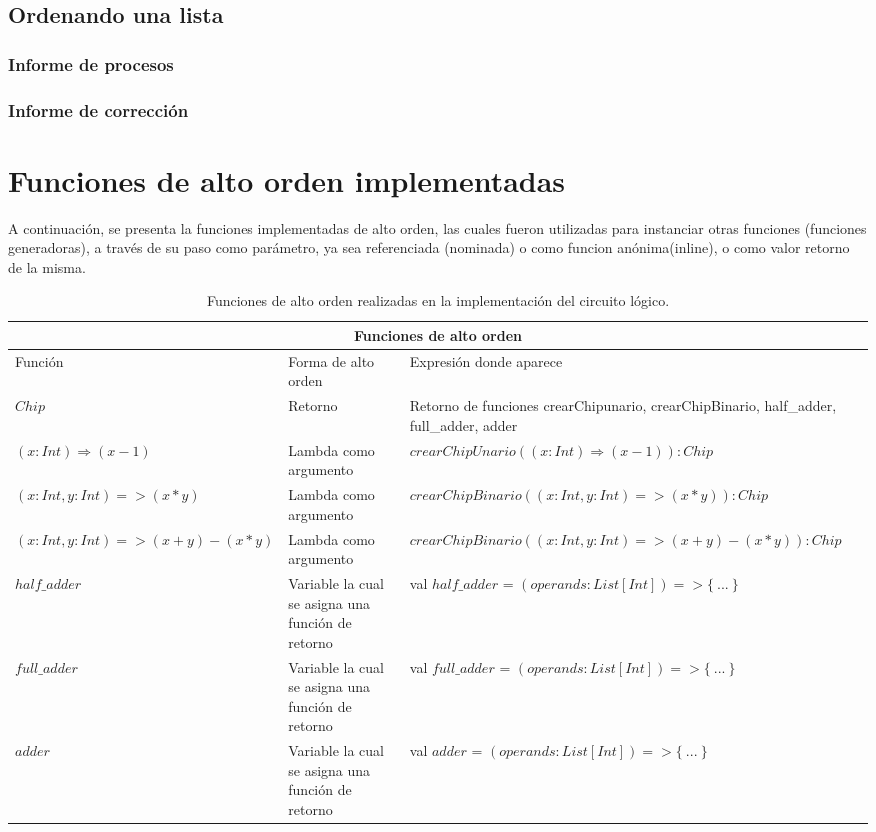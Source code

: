 \documentclass[12pt, a4paper]{article}
\begin{document}
\subsection{Ordenando una lista}
\subsubsection{Informe de procesos}
\subsubsection{Informe de corrección}
\section{Funciones de alto orden implementadas}

A continuación, se presenta la funciones implementadas de alto orden, las cuales fueron utilizadas para instanciar otras funciones (funciones generadoras), a través de su paso como parámetro, ya sea referenciada (nominada) o como funcion anónima(inline), o como valor retorno de la misma. \\[16pt]

\begin{table}
 \scriptsize
\begin{tabular}{ |p{4cm}||p{3cm}|p{5.5cm}|  }
 \hline
 \multicolumn{3}{|c|}{Funciones de alto orden} \\
 \hline
 Función& Forma de alto orden  & Expresión donde aparece\\
 \hline
  $Chip$ & Retorno & Retorno de funciones crearChipunario, crearChipBinario, half\_adder, full\_adder, adder\\
  \hline
  $(x:Int) \Rightarrow (x - 1)$  & Lambda como argumento &  $crearChipUnario((x:Int) \Rightarrow (x - 1)):Chip$\\
  \hline
  $ (x: Int, y: Int ) => (x * y)$  & Lambda como argumento &  $crearChipBinario((x: Int, y: Int ) => (x * y)): Chip$\\
  \hline
  $(x: Int, y: Int ) => (x + y) - (x * y )$  & Lambda como argumento &  $crearChipBinario((x: Int, y: Int ) => (x + y) - (x * y )): Chip$\\
\hline
  $half\_adder$ & Variable la cual se asigna una función de retorno & val $half\_adder$ = $( operands: List[Int]) => \{~...~ \}$\\
\hline
  $full\_adder$& Variable la cual se asigna una función de retorno  & val $full\_adder$ = $( operands: List[Int]) => \{~...~ \}$\\
\hline
  $adder$& Variable la cual se asigna una función de retorno & val $adder$ = $( operands: List[Int]) => \{~...~ \}$ \\
 \hline
\end{tabular}
\centering
\caption{Funciones de alto orden realizadas en la implementación del circuito lógico.}
\label{tabla:1}
\end{table}
\end{document}
